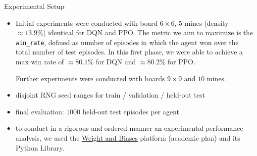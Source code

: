 \begin{frame}{Experimental Setup}
  \begin{itemize}
    \item Initial experiments were conducted with board $6 \times 6$, $5$ mines
          (density $\approx 13.9\%$) \alert{identical} for DQN and PPO. The metric
          we aim to maximize is the \texttt{win\_rate}, defined as number of episodes
          in which the agent won over the total number of test episodes. In this first phase,
          we were able to achieve a max win rate of $\approx 80.1\%$ for DQN and $\approx 80.2\%$ for
          PPO.

          Further experiments were conducted with boards $9 \times 9$ and $10$ mines.
    \item disjoint RNG seed ranges for train / validation / held-out test
    \item final evaluation: $1000$ held-out test episodes per agent
    \item to conduct in a rigorous and ordered manner an experimental performance analysis,
          we used the \href{https://wandb.ai/site/}{Weight and Biases} platform (academic plan) and its Python Library.
  \end{itemize}
\end{frame}

